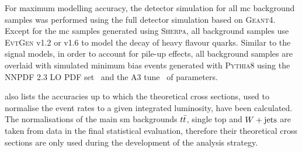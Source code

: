 For maximum modelling accuracy, the detector simulation for all \gls{mc} background samples was performed using the full detector simulation based on \textsc{Geant4}. Except for the \gls{mc} samples generated using \textsc{Sherpa}, all background samples use \textsc{EvtGen} v1.2 or v1.6 to model the decay of heavy flavour quarks. Similar to the signal models, in order to account for pile-up effects, all background samples are overlaid with simulated minimum bias events generated with \textsc{Pythia8} using the NNPDF 2.3 LO \gls{PDF} set~\cite{Ball:2012cx} and the A3 tune~\cite{ATL-PHYS-PUB-2016-017} of parameters. 

 also lists the accuracies up to which the theoretical cross sections, used to normalise the event rates to a given integrated luminosity, have been calculated. The normalisations of the main \gls{sm} backgrounds $t\bar{t}$, single top and $W+\mathrm{jets}$ are taken from data in the final statistical evaluation, therefore their theoretical cross sections are only used during the development of the analysis strategy.

